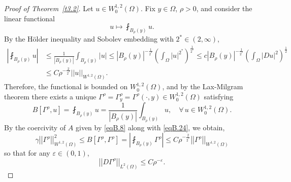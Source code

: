\documentclass[12pt,reqno]{amsart}
\theoremstyle{plain}
\theoremstyle{definition}
\newenvironment{pf}
{\begin{proof}} {\end{proof}}
\newcommand{\eps}{\varepsilon}
\newcommand{\ga}{\gamma}
\newcommand{\Ga}{\Gamma}
\newcommand{\Om}{\Omega}
\newcommand{\iny}{\infty}
\newcommand{\norm}[1]{\left\vert \left\vert #1\right\vert\right\vert}
\newcommand{\abs}[1]{\left\vert#1\right\vert}
\newcommand{\brac}[1]{\left[#1\right]}
\newcommand{\pr}[1]{\left( #1 \right) }
\begin{document}
\begin{appendix}
\begin{pf}[Proof of Theorem~\ref{t3.2}] 
Let $u \in W^{1,2}_0\pr{\Om}$. 
Fix $y\in \Om$, $\rho > 0$, and consider the linear functional
$$u \mapsto \fint_{B_\rho(y)} u.$$
By  the H\"older inequality and Sobolev embedding with $2^* \in \pr{2, \iny}$,
\begin{align}
\abs{ \fint_{B_\rho(y)} u}
&\le \frac{1}{\abs{B_\rho\pr{y}}} \int_{B_\rho\pr{y}} \abs{u}
\le \abs{B_\rho\pr{y}}^{-\frac{1}{2^*}} \pr{\int_{\Om} \abs{u}^{2^*} }^{\frac{1}{2^*}} 
\le c \abs{B_\rho\pr{y}}^{-\frac{1}{2^*}} \pr{\int_{\Om} \abs{Du}^{2} }^{\frac{1}{2}}  \nonumber \\
&\le C \rho^{-\frac{2}{2^*}} \norm{u}_{W^{1,2}\pr{\Om}}.
\label{eqB.24}
\end{align}
Therefore, the functional is bounded on $W^{1,2}_0\pr{\Om}$, and by the Lax-Milgram theorem there exists a unique $\Ga^\rho = \Ga^\rho_y = \Ga^\rho\pr{\cdot, y} \in W^{1,2}_0\pr{\Om}$ satisfying 
\begin{equation}
\label{eqB.25}
{B}[\Ga^\rho, u] = \fint_{B_\rho(y)} u = \frac{1}{\abs{B_\rho(y)}} \int_{B_\rho(y)} u, \quad \forall \, u \in W^{1,2}_0\pr{\Om}.
\end{equation}
By the coercivity of $A$ given by \eqref{eqB.8} along with \eqref{eqB.24}, we obtain,
$$\ga \norm{\Ga^\rho}^2_{W^{1,2}\pr{\Om}}
\le {B}\brac{\Ga^\rho,\Ga^\rho}
= \abs{\fint_{B_\rho(y)} \Ga^\rho}
\le C \rho^{-\frac{2}{2^*}} \norm{\Ga^\rho}_{W^{1,2}\pr{\Om}}$$
so that for any $\eps \in \pr{0, 1}$,
\begin{equation}
\label{eqB.26}
\norm{D\Ga^\rho}_{L^2\pr{\Om}} 
\le C \rho^{-\eps}.
\end{equation}


\end{pf}
\end{appendix}
\end{document}

